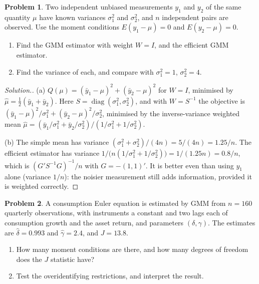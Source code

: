 \documentclass[11pt,a4paper]{article}
\numberwithin{equation}{section}
\theoremstyle{definition}
\newtheorem{problemx}{Problem}[subsection]
\newenvironment{problem}{\begin{problemx}}{\end{problemx}}
\newenvironment{solution}
  {\renewcommand{\qedsymbol}{}\begin{proof}[\textit{Solution}.]}
  {\end{proof}}
\begin{document}
\begin{problem}
Two independent unbiased measurements $y_1$ and $y_2$ of the same quantity $\mu$ have known variances $\sigma_1^2$ and $\sigma_2^2$, and $n$ independent pairs are observed. Use
the moment conditions $E(y_1 - \mu) = 0$ and $E(y_2 - \mu) = 0$.
\begin{enumerate}[label=(\alph*)]
\item Find the GMM estimator with weight $W = I$, and the efficient GMM estimator.
\item Find the variance of each, and compare with $\sigma_1^2 = 1$, $\sigma_2^2 = 4$.
\end{enumerate}
\end{problem}

\begin{solution}
(a) $Q(\mu) = (\bar y_1 - \mu)^2 + (\bar y_2 - \mu)^2$ for $W = I$, minimised by $\hat\mu = \frac12(\bar y_1 + \bar y_2)$. Here $S = \operatorname{diag}(\sigma_1^2, \sigma_2^2)$, and with $W = S^{-1}$ the objective is
$(\bar y_1 - \mu)^2/\sigma_1^2 + (\bar y_2 - \mu)^2/\sigma_2^2$, minimised by the inverse-variance weighted mean $\hat\mu = (\bar y_1/\sigma_1^2 + \bar y_2/\sigma_2^2)/(1/\sigma_1^2 + 1/\sigma_2^2)$.

(b) The simple mean has variance $(\sigma_1^2 + \sigma_2^2)/(4n) = 5/(4n) = 1.25/n$. The efficient estimator has variance $1/\bigl(n(1/\sigma_1^2 + 1/\sigma_2^2)\bigr) = 1/(1.25n) = 0.8/n$, which is
$(G'S^{-1}G)^{-1}/n$ with $G = -(1, 1)'$. It is better even than using $y_1$ alone (variance $1/n$): the noisier measurement still adds information, provided it is weighted
correctly.
\end{solution}

\begin{problem}
A consumption Euler equation is estimated by GMM from $n = 160$ quarterly observations, with instruments a constant and two lags each of consumption
growth and the asset return, and parameters $(\delta, \gamma)$. The estimates are $\hat\delta = 0.993$ and $\hat\gamma = 2.4$, and $J = 13.8$.
\begin{enumerate}[label=(\alph*)]
\item How many moment conditions are there, and how many degrees of freedom does the $J$ statistic have?
\item Test the overidentifying restrictions, and interpret the result.
\end{enumerate}
\end{problem}
\end{document}
